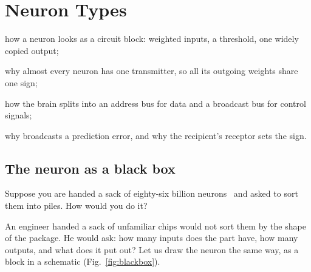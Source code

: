 \chapter{Neuron Types}
\label{sec:neurontypes}
\begin{chaptergoals}
\item how a neuron looks as a circuit block: weighted inputs, a threshold, one widely copied output;
\item why almost every neuron has one transmitter, so all its outgoing weights share one sign;
\item how the brain splits into an address bus for data and a broadcast bus for control signals;
\item why  broadcasts a prediction error, and why the recipient's receptor sets the sign.
\end{chaptergoals}

\section{The neuron as a black box}

Suppose you are handed a sack of eighty-six billion neurons~\cite{Azevedo2009} and asked to sort them into piles. How would you do it?

An engineer handed a sack of unfamiliar chips would not sort them by the shape of the package. He would ask: how many inputs does the part have, how many outputs, and what does it put out? Let us draw the neuron the same way, as a block in a schematic (Fig.~\ref{fig:blackbox}).

